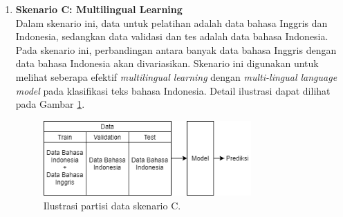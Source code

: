\begin{enumerate}
		\item \textbf{Skenario C: Multilingual Learning}\\
		Dalam skenario ini, data untuk pelatihan adalah data bahasa Inggris dan Indonesia, sedangkan data validasi dan tes adalah data bahasa Indonesia. Pada skenario ini, perbandingan antara banyak data bahasa Inggris dengan data bahasa Indonesia akan divariasikan. Skenario ini digunakan untuk melihat seberapa efektif \textit{multilingual learning} dengan \textit{multi-lingual language model} pada klasifikasi teks bahasa Indonesia. Detail ilustrasi dapat dilihat pada Gambar \ref{fig:data_tipe_c}.
		\begin{figure}[h]
		    \centering
		    \includegraphics[width=0.75\textwidth]{resources/Data-tipe-C.png}
		    \caption{Ilustrasi partisi data skenario C.}
		    \label{fig:data_tipe_c}
		\end{figure}
		
	\end{enumerate}


	
